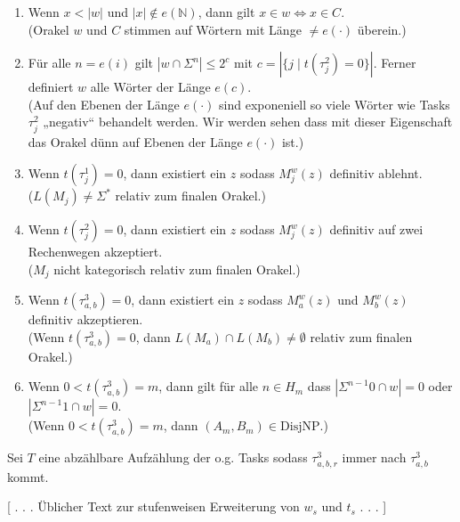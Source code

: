\documentclass[nofonts]{uebung}
\def\DisjNP{\ensuremath{\mathrm{DisjNP}}}
\begin{document}
\begin{enumerate}[label={V\arabic*}]
    \item Wenn $x<|w|$ und $|x|\not\in e(\mathbb N)$, dann gilt $x\in w\iff x\in C$.\\
        (Orakel $w$ und $C$ stimmen auf Wörtern mit Länge $\neq e(\cdot)$ überein.)
    \item Für alle $n=e(i)$ gilt $|w\cap \Sigma^n|\leq 2^{c}$ mit $c=|\{j\mid t(\tau^2_j)=0 \}|$.
        Ferner definiert $w$ alle Wörter der Länge $e(c)$.\\
        (Auf den Ebenen der Länge $e(\cdot)$ sind exponeniell so viele Wörter wie Tasks $\tau^2_j$ „negativ“ behandelt werden. Wir werden sehen dass mit dieser Eigenschaft das Orakel dünn auf Ebenen der Länge $e(\cdot)$ ist.)
    \item Wenn $t(\tau^1_j)=0$, dann existiert ein $z$ sodass $M_j^w(z)$ definitiv ablehnt.\\
        ($L(M_j)\neq \Sigma^*$ relativ zum finalen Orakel.)
    \item Wenn $t(\tau^2_j)=0$, dann existiert ein $z$ sodass $M_j^w(z)$ definitiv auf zwei Rechenwegen akzeptiert.\\
        ($M_j$ nicht kategorisch relativ zum finalen Orakel.)
    \item Wenn $t(\tau^3_{a,b})=0$, dann existiert ein $z$ sodass $M_a^w(z)$ und $M_b^w(z)$ definitiv akzeptieren.\\
        (Wenn $t(\tau^3_{a,b})=0$, dann $L(M_a)\cap L(M_b)\neq \emptyset$ relativ zum finalen Orakel.)
    \item Wenn $0<t(\tau^3_{a,b})=m$, dann gilt für alle $n\in H_m$ dass $|\Sigma^{n-1}0\cap w|=0$ oder $|\Sigma^{n-1}1\cap w|=0$.\\
        (Wenn $0<t(\tau^3_{a,b})=m$, dann $(A_m,B_m)\in\DisjNP$.)
\end{enumerate}

Sei $T$ eine abzählbare Aufzählung der o.g. Tasks sodass $\tau^3_{a,b,r}$ immer nach $\tau^3_{a,b}$ kommt.

[ . . . Üblicher Text zur stufenweisen Erweiterung von $w_s$ und $t_s$ . . . ]
\end{document}
